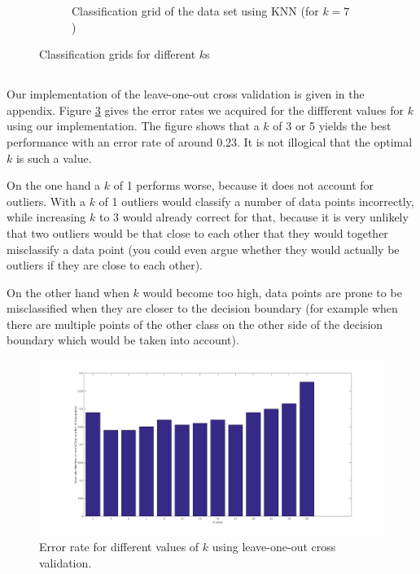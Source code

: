 \documentclass[10pt]{article}
\begin{document}
\begin{figure}[H]
\begin{subfigure}{.49\textwidth}
    \caption{Classification grid of the data set using KNN (for $k=7$)}
    \label{fig2.1d}
  \end{subfigure}
  \caption{Classification grids for different $k$s}
  \label{fig2.1}
\end{figure}

\subsection{}
Our implementation of the leave-one-out cross validation is given in the appendix. Figure \ref{fig2.3} gives the error rates we acquired for the diffferent values for $k$ using our implementation. The figure shows that a $k$ of 3 or 5 yields the best performance with an error rate of around 0.23. It is not illogical that the optimal $k$ is such a value. 

On the one hand a $k$ of 1 performs worse, because it does not account for outliers. With a $k$ of 1 outliers would classify a number of data points incorrectly, while increasing $k$ to 3 would already correct for that, because it is very unlikely that two outliers would be that close to each other that they would together misclassify a data point (you could even argue whether they would actually be outliers if they are close to each other). 

On the other hand when $k$ would become too high, data points are prone to be misclassified when they are closer to the decision boundary (for example when there are multiple points of the other class on the other side of the decision boundary which would be taken into account).

\begin{figure}[H]
 \centering
 \includegraphics[width=\textwidth]{assign2_3.png}
 \caption{Error rate for different values of $k$ using leave-one-out cross validation.}
 \label{fig2.3}
\end{figure}
\end{document}
